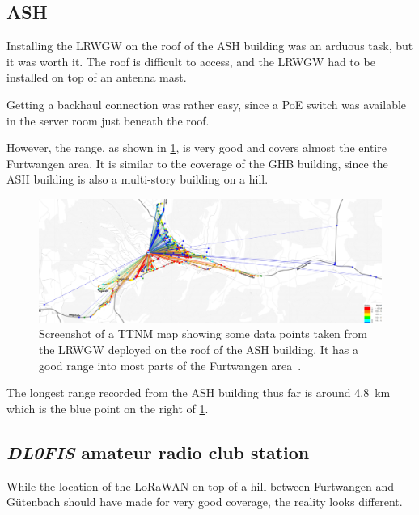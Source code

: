 \subsection{\acl{ASH}}

Installing the \acl{LRWGW} on the roof of the \ac{ASH} building was an arduous task, but it was worth it.
The roof is difficult to access, and the \acl{LRWGW} had to be installed on top of an antenna mast.

Getting a backhaul connection was rather easy, since a \ac{PoE} switch was available in the server room just beneath the roof.

However, the range, as shown in \cref{pic:ash_gw_range}, is very good and covers almost the entire Furtwangen area.
It is similar to the coverage of the \ac{GHB} building, since the \ac{ASH} building is also a multi-story building on a hill.

\begin{figure}[htbp]
    \centering
    \includegraphics[width=1\textwidth]{pictures/ttn-mapper/gateway-ranges/ash_gw_range.jpg}
    \caption{
        Screenshot of a \ac{TTNM} map showing some data points taken from the \acl{LRWGW} deployed on the roof of the \ac{ASH} building.
        It has a good range into most parts of the Furtwangen area~\cite{ttn_mapper_ttn_2023}.
    }\label{pic:ash_gw_range}
\end{figure}

The longest range recorded from the \ac{ASH} building thus far is around \SI{4.8}{\kilo\meter} which is the blue point on the right of \cref{pic:ash_gw_range}.

\subsection{\emph{DL0FIS} amateur radio club station}

While the location of the \ac{LoRaWAN} on top of a hill between Furtwangen and Gütenbach should have made for very good coverage, the reality looks different.

